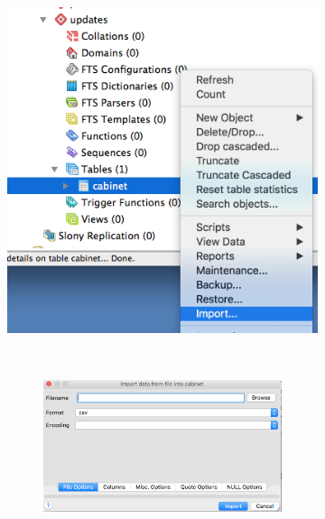 \begin{figure}[ht!]
\centering
  \begin{subfigure}{.50\textwidth}
  \includegraphics[width=\textwidth,trim= 0 0 0 0, clip]{pcdb_documentation_screenshots/pgadmin3_import_data_to_table.png}
    \label{fig_pgadmin3_import_data_to_table}
  \end{subfigure}
  ~%
  \begin{subfigure}{.40\textwidth}
    \begin{subfigure}{1\linewidth}
    \includegraphics[width=\textwidth,trim= 0 0 0 0, clip]{pcdb_documentation_screenshots/pgadmin3_import_data_wizard_file_options.png}

\end{subfigure}
\end{subfigure}
\end{figure}
